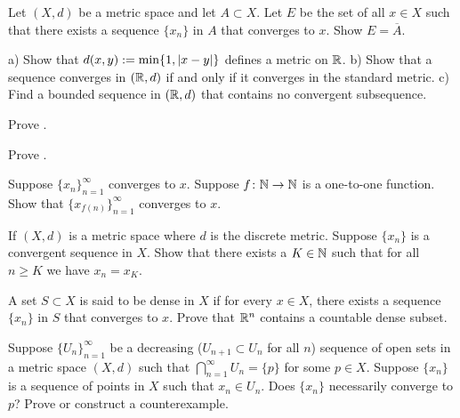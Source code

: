 \begin{exercise} \label{exercise:reverseclosedseq}
Let $(X,d)$ be a metric space and
let $A \subset X$.  Let $E$ be the set of all $x \in X$ such that there
exists a sequence $\{ x_n \}$ in $A$ that converges to $x$.  Show 
$E = \overline{A}$.
\end{exercise}

\begin{exercise}
a) Show that $d(x,y) := \min \{ 1, \left\lvert {x-y} \right\rvert \}$ defines a metric on ${\mathbb{R}}$.
b) Show that a sequence converges in $({\mathbb{R}},d)$ if and only if it converges
in the standard metric.  c) Find a bounded sequence in $({\mathbb{R}},d)$ that
contains no convergent subsequence.
\end{exercise}

\begin{exercise}
Prove .
\end{exercise}

\begin{exercise}
Prove .
\end{exercise}

\begin{exercise}
Suppose $\{x_n\}_{n=1}^\infty$ converges to $x$.  Suppose $f \colon {\mathbb{N}}
\to {\mathbb{N}}$ is a one-to-one function.  Show that
$\{ x_{f(n)} \}_{n=1}^\infty$ converges to $x$.
\end{exercise}

\begin{exercise}
If $(X,d)$ is a metric space where $d$ is the discrete metric.  Suppose 
$\{ x_n \}$ is a convergent sequence in $X$.  Show that there exists
a $K \in {\mathbb{N}}$ such that for all $n \geq K$ we have $x_n = x_K$.
\end{exercise}

\begin{exercise}
A set $S \subset X$ is said to be dense in $X$ if for every $x \in X$,
there exists a sequence $\{ x_n \}$ in $S$ that converges to $x$.  Prove
that ${\mathbb{R}}^n$ contains a countable dense subset.
\end{exercise}

\begin{exercise}[Tricky]
Suppose $\{ U_n \}_{n=1}^\infty$ be a decreasing ($U_{n+1} \subset U_n$ for
all $n$) sequence of open sets in a metric space $(X,d)$ such that
$\bigcap_{n=1}^\infty U_n = \{ p \}$ for some $p \in X$.  Suppose 
$\{ x_n \}$ is a sequence of points in $X$ such that $x_n \in U_n$.  Does
$\{ x_n \}$ necessarily converge to $p$?  Prove or construct a counterexample.
\end{exercise}

